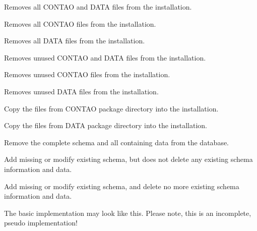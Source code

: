\vspace{.5cm}
 Removes all CONTAO and DATA files from the installation.

\vspace{.5cm}
 Removes all CONTAO files from the installation.

\vspace{.5cm}
 Removes all DATA files from the installation.

\vspace{.5cm}
 Removes unused CONTAO and DATA files from the installation.

\vspace{.5cm}
 Removes unused CONTAO files from the installation.

\vspace{.5cm}
 Removes unused DATA files from the installation.

\vspace{.5cm}
 Copy the files from CONTAO package directory into the installation.

\vspace{.5cm}
 Copy the files from DATA package directory into the installation.

\vspace{.5cm}
 Remove the complete schema and all containing data from the database.

\vspace{.5cm}
 Add missing or modify existing schema, but does not delete any existing schema information and data.

\vspace{.5cm}
 Add missing or modify existing schema, and delete no more existing schema information and data.

\vspace{.5cm}
The basic implementation may look like this. Please note, this is an incomplete, pseudo implementation!

